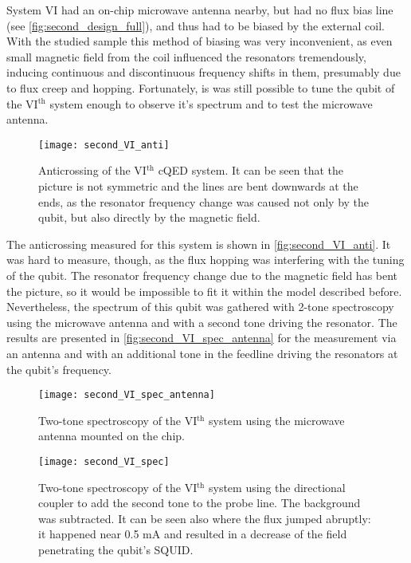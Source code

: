\documentclass[12pt, twoside]{report}
\numberwithin{equation}{section}
\begin{document}
System VI had an on-chip microwave antenna nearby, but had no flux bias line (see \autoref{fig:second_design_full}), and thus had to be biased by the external coil. With the studied sample this method of biasing was very inconvenient, as even small magnetic field from the coil influenced the resonators tremendously, inducing continuous and discontinuous frequency shifts in them, presumably due to flux creep and hopping. Fortunately, is was still possible to tune the qubit of the VI$^{\text{th}}$ system enough to observe it's spectrum and to test the microwave antenna.

\begin{figure}
\centering
\texttt{[image: second\_VI\_anti]}
\caption{Anticrossing of the VI$^{\text{th}}$ cQED system. It can be seen that the picture is not symmetric and   the lines are bent downwards at the ends, as the resonator frequency change was caused not only by the qubit, but also directly by the magnetic field.}
\label{fig:second_VI_anti}
\end{figure}

The anticrossing measured for this system is shown in \autoref{fig:second_VI_anti}. It was hard to measure, though, as the flux hopping was interfering with the tuning of the qubit. The resonator frequency change due to the magnetic field has bent the picture, so it would be impossible to fit it within the model described before. Nevertheless, the spectrum of this qubit was gathered with 2-tone spectroscopy using the microwave antenna and with a second tone driving the resonator. The results are presented in \autoref{fig:second_VI_spec_antenna} for the measurement via an antenna and with an additional tone in the feedline driving the resonators at the qubit's frequency.

\begin{figure}[h]
\texttt{[image: second\_VI\_spec\_antenna]}
\caption{Two-tone spectroscopy of the VI$^{\text{th}}$ system using the microwave antenna mounted on the chip.}
\label{fig:second_VI_spec_antenna}
\end{figure}

\begin{figure}[h]
\texttt{[image: second\_VI\_spec]}
\caption{Two-tone spectroscopy of the VI$^{\text{th}}$ system using the directional coupler to add the second tone to the probe line. The background was subtracted. It can be seen also where the flux jumped abruptly: it happened near 0.5 mA and resulted in a decrease of the field penetrating the qubit's SQUID.}
\label{fig:second_VI_spec_antenna}
\end{figure}
\end{document}
